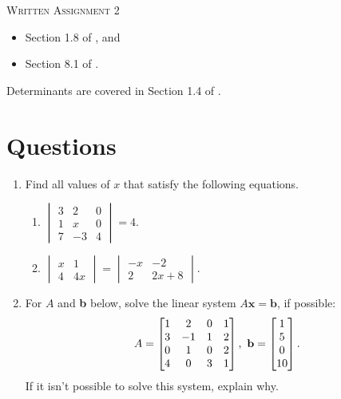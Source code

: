 \documentclass{article}
\date{}
\begin{document}
\begin{center}
\textsc{\LARGE Written Assignment 2}\\[0.5cm]
\end{center}
\From 
\begin{itemize}
\item Section 1.8 of \VCT, and 
\item Section 8.1 of \CAT.
\end{itemize}
Determinants are covered in Section 1.4 of \VCT.

\section*{Questions}

\begin{enumerate}
\item

Find all values of $x$ that satisfy the following equations.

\begin{enumerate}
\item \(
 \begin{vmatrix}
  3 &  2 &  0 \\
  1 &  x &  0 \\
  7 & -3 &  4
 \end{vmatrix} = 4.
\)
\item \(
 \begin{vmatrix}
  x & 1 \\
  4 & 4x
 \end{vmatrix} = \begin{vmatrix}
  -x & -2 \\
  2 & 2x + 8
 \end{vmatrix}
\).
\end{enumerate}

\item
For $A$ and \textbf{b} below, solve the linear system $A\mathbf{x} = \mathbf{b}$, if possible:
\begin{align*}
 A = \BM
  1 & 2 & 0 & 1 \\
  3 & -1 & 1 & 2 \\
  0 & 1 & 0 & 2 \\
  4 & 0 & 3 & 1
 \EM, \ 
 \mathbf{b} = \BM 1 \\ 5 \\ 0 \\ 10 \EM.
\end{align*}
 If it isn't possible to solve this system, explain why. 


\end{enumerate}
\end{document}
